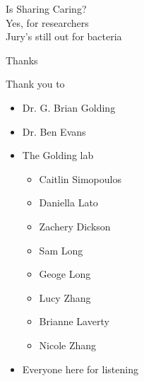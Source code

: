 \documentclass[dvipsnames]{beamer}
\begin{document}
\begin{frame}[fragile]{}
    \begin{center}
         \Huge \textcolor{OliveGreen}{Is Sharing Caring?}\\
        \vspace{0.2in}
        \Large
         Yes, for researchers\\
         Jury's still out for bacteria
    \end{center}
\end{frame}
\begin{frame}{Thanks}
    \begin{multicols}{2}
    \begin{minipage}[b][40ex][t]{\linewidth}
    Thank you to
    \begin{itemize}
        \item Dr. G. Brian Golding
        \item Dr. Ben Evans
        \item The Golding lab
            \begin{itemize}
                \item Caitlin Simopoulos
                \item Daniella Lato
                \item Zachery Dickson
                \item Sam Long
                \item Geoge Long
                \item Lucy Zhang
                \item Brianne Laverty
                \item Nicole Zhang
            \end{itemize}
        \item Everyone here for listening
    \end{itemize}
    \end{minipage}
    \begin{minipage}[b][20ex][t]{\linewidth}
    \begin{figure}[htb!]

\end{figure}
\end{minipage}
\end{multicols}
\end{frame}
\end{document}
